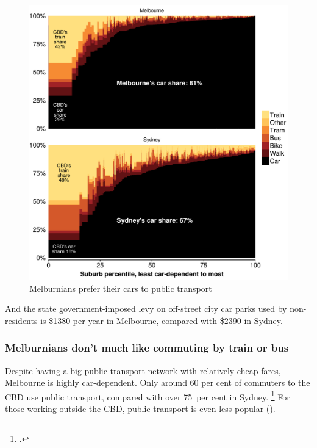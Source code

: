 \documentclass{grattan}
\begin{document}
\begin{figure}
\caption{Melburnians prefer their cars to public transport}\label{fig:marimekko-mode}
\includegraphics[width=1.14\columnwidth]{atlas/Travel-mode-SYDMEL-1.pdf}
\end{figure}

And the state government-imposed levy on off-street city car parks used by non-residents is \$1380 per year in Melbourne, compared with \$2390 in Sydney.




\subsubsection{Melburnians don't much like commuting by train or bus}

Despite having a big public transport network with relatively cheap fares, Melbourne is highly car-dependent.
Only around 60 per cent of commuters to the CBD use public transport,
compared with over 75~per cent in Sydney.%
    \footcite{ABS2011Census}
For those working outside the CBD, public transport is even less popular ().
\end{document}
